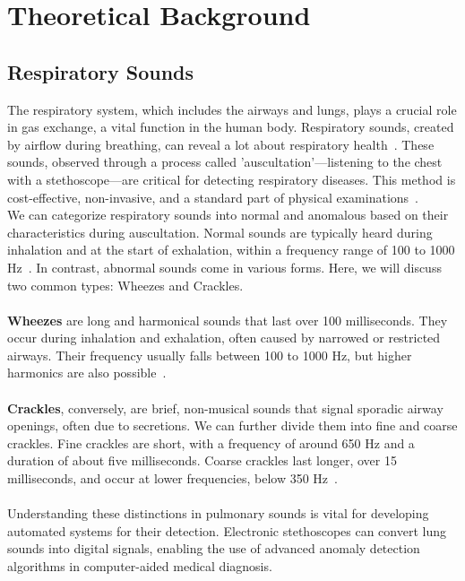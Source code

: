 \cleardoubleoddpage%
\chapter{Theoretical Background}

\section{Respiratory Sounds}
\label{theory:sounds}
The respiratory system, which includes the airways and lungs, plays a crucial role in gas exchange, a vital function in the human body. Respiratory sounds, created by airflow during breathing, can reveal a lot about respiratory health~\cite{earis1992lung}. These sounds, observed through a process called 'auscultation'—listening to the chest with a stethoscope—are critical for detecting respiratory diseases. This method is cost-effective, non-invasive, and a standard part of physical examinations~\cite{bohadana2014fundamentals}.\\
We can categorize respiratory sounds into normal and anomalous based on their characteristics during auscultation. Normal sounds are typically heard during inhalation and at the start of exhalation, within a frequency range of 100 to 1000 Hz~\cite{bohadana2014fundamentals}. In contrast, abnormal sounds come in various forms. Here, we will discuss two common types: Wheezes and Crackles.\\\\
\textbf{Wheezes} are long and harmonical sounds that last over 100 milliseconds. They occur during inhalation and exhalation, often caused by narrowed or restricted airways. Their frequency usually falls between 100 to 1000 Hz, but higher harmonics are also possible~\cite{bohadana2014fundamentals}.\\\\
\textbf{Crackles}, conversely, are brief, non-musical sounds that signal sporadic airway openings, often due to secretions. We can further divide them into fine and coarse crackles. Fine crackles are short, with a frequency of around 650 Hz and a duration of about five milliseconds. Coarse crackles last longer, over 15 milliseconds, and occur at lower frequencies, below 350 Hz~\cite{bohadana2014fundamentals}.\\\\
Understanding these distinctions in pulmonary sounds is vital for developing automated systems for their detection. Electronic stethoscopes can convert lung sounds into digital signals, enabling the use of advanced anomaly detection algorithms in computer-aided medical diagnosis.

